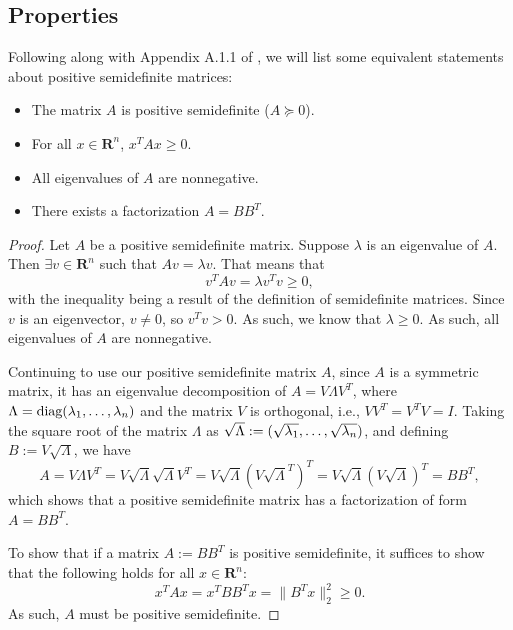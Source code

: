 	\subsection{Properties}
	
	Following along with Appendix A.1.1 of \cite{BlekhermanGrigoriy;ParriloPabloA.;Thomas2013}, we will list some equivalent statements about positive semidefinite matrices:
	
	\begin{itemize}
		\item The matrix $A$ is positive semidefinite ($A \succeq 0$).
		
		\item For all $x \in \mathbf{R}^n$, $x^T A x \geq 0$.
		
		\item All eigenvalues of $A$ are nonnegative.
		
		
		
		
		\item There exists a factorization $A = B B^T$.
	\end{itemize}
	
	\begin{proof}
		Let $A$ be a positive semidefinite matrix. Suppose $\lambda$ is an eigenvalue of $A$. Then $\exists v \in \mathbf{R}^n$ such that $Av = \lambda v$. That means that $$
		v^T A v = \lambda v^T v \geq 0,
		$$
		with the inequality being a result of the definition of semidefinite matrices. Since $v$ is an eigenvector, $v \ne 0$, so $v^Tv > 0$. As such, we know that $\lambda \geq 0$. As such, all eigenvalues of $A$ are nonnegative. 
		
		Continuing to use our positive semidefinite matrix $A$, since $A$ is a symmetric matrix, it has an eigenvalue decomposition of $A = V \Lambda V^T$, where $\Lambda = \textnormal{diag}(\lambda_1, \dots, \lambda_n)$ and the matrix $V$ is orthogonal, i.e., $V V^T = V^T V = I$. Taking the square root of the matrix $\Lambda$ as $\sqrt{\Lambda} := \textnormal(\sqrt{\lambda_1}, \dots, \sqrt{\lambda_n})$, and defining $B := V \sqrt{\Lambda}$, we have 
		$$
		A = V \Lambda V^T = V \sqrt{\Lambda} \sqrt{\Lambda} V^T = V \sqrt{\Lambda} (V \sqrt{\Lambda}^T)^T = V \sqrt{\Lambda} (V \sqrt{\Lambda})^T = B B^T,
		$$
		which shows that a positive semidefinite matrix has a factorization of form $A = B B^T$.
		
		To show that if a matrix $A := B B^T$ is positive semidefinite, it suffices to show that the following holds for all $x \in \mathbf{R}^n$:
		$$
		x^T A x = x^T B B^T x = \|B^T x\|_2^2 \geq 0.
		$$
		As such, $A$ must be positive semidefinite.
	\end{proof}
	
